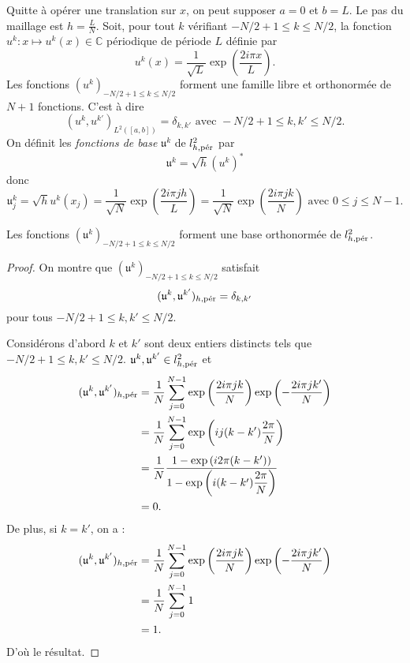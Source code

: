 Quitte à opérer une translation sur $x$, on peut supposer $a=0$ et $b=L$. Le pas du maillage est $h = \frac{L}{N}$.
Soit, pour tout $k$ vérifiant $-N/2+1 \leq k \leq N/2$, la fonction $u^k : x \mapsto u^k(x) \in \mathbb{C}$ périodique de période $L$ définie par 
\begin{equation}
u^k(x) = \dfrac{1}{\sqrt{L}} \exp \left( \dfrac{2 i \pi x}{L} \right).
\end{equation}
Les fonctions $(u^k)_{-N/2 +1 \leq k \leq N/2}$ forment une famille libre et orthonormée de $N+1$ fonctions. C'est à dire
\begin{equation}
(u^k, u^{k'})_{L^2([a,b])} = \delta_{k,k'} \text{ avec } -N/2+1 \leq k, k' \leq N/2.
\end{equation}
On définit les \textit{fonctions de base} $\mathfrak{u}^k$ de $l^2_{h,\per}$ par
\begin{equation}
\mathfrak{u}^k = \sqrt{h} (u^k)^*
\end{equation}
donc 
\begin{equation}
\mathfrak{u}^k_j = \sqrt{h}  u^k(x_j) = \dfrac{1}{\sqrt{N}} \exp \left( \dfrac{2 i \pi j h}{L} \right) = \dfrac{1}{\sqrt{N}} \exp \left( \dfrac{2 i \pi j k}{N} \right) \text{ avec } 0 \leq j \leq N-1.
\label{eq:base_fourier_disc}
\end{equation}


\begin{proposition}
Les fonctions $(\mathfrak{u}^k)_{-N/2+1 \leq k \leq N/2}$ forment une base orthonormée de $l^2_{h,\per}$.
\end{proposition}

\begin{proof}
On montre que $(\mathfrak{u}^k)_{-N/2+1 \leq k \leq N/2}$ satisfait
\begin{equation}
(\mathfrak{u}^k, \mathfrak{u}^{k'})_{h,\per} = \delta_{k,k'}
\end{equation}
pour tous $-N/2+1 \leq k, k' \leq N/2$.

Considérons d'abord $k$ et $k'$ sont deux entiers distincts tels que $-N/2+1 \leq k, k' \leq N/2$. $\mathfrak{u}^k, \mathfrak{u}^{k'} \in l^2_{h,\per}$ et
\begin{align*}
(\mathfrak{u}^k, \mathfrak{u}^{k'})_{h,\per} & = \dfrac{1}{N} \gsum_{j=0}^{N-1} \exp \left( \dfrac{2 i \pi j k}{N} \right) \exp \left( -\dfrac{2 i \pi j k'}{N} \right) \\
		& = \dfrac{1}{N} \gsum_{j=0}^{N-1} \exp \left( i j (k-k') \dfrac{2 \pi}{N} \right)\\
		& = \dfrac{1}{N} \dfrac{1 - \exp \left( i 2 \pi (k-k') \right)}{1 - \exp \left( i (k-k') \dfrac{2 \pi}{N}  \right)} \\
		& = 0.
\end{align*}
De plus, si $k=k'$, on a :
\begin{align*}
(\mathfrak{u}^k, \mathfrak{u}^{k'})_{h,\per} & = \dfrac{1}{N} \gsum_{j=0}^{N-1} \exp \left( \dfrac{2 i \pi j k}{N} \right) \exp \left( -\dfrac{2 i \pi j k'}{N} \right) \\
		& = \dfrac{1}{N} \gsum_{j=0}^{N-1} 1 \\
		& = 1.
\end{align*}
D'où le résultat.
\end{proof}

